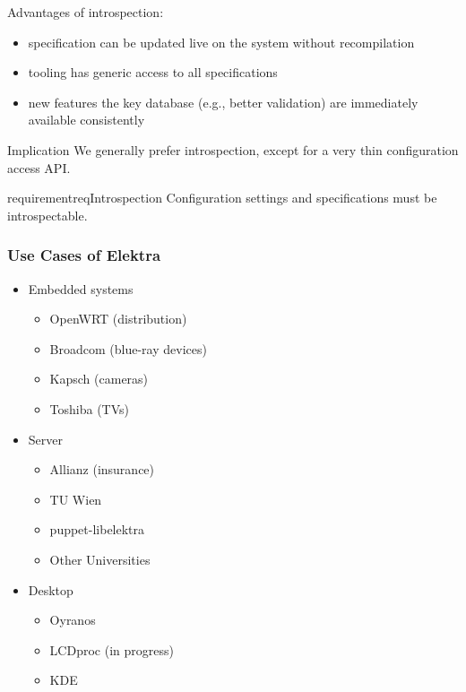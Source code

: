 \begin{frame}
	Advantages of introspection:
	\pause
	\begin{itemize}
	\item specification can be updated live on the system without recompilation
	\item tooling has generic access to all specifications
 	\item new features the key database (e.g., better validation) are immediately available consistently
	\end{itemize}
	\vspace{1em}
	\begin{alertblock}{Implication}
	We generally prefer introspection, except for a very thin configuration access API.
	\end{alertblock}
	\vspace{1em}
	\begin{restatable}{requirement}{reqIntrospection}
	Configuration settings and specifications must be introspectable.%
	\end{restatable}
\end{frame}

\begin{frame}
	\frametitle{Use Cases of Elektra}
	\begin{itemize}[<+->]
	\item Embedded systems
	\begin{itemize}
	\item OpenWRT (distribution)
	\item Broadcom (blue-ray devices)
	\item Kapsch (cameras)
	\item Toshiba (TVs)
	\end{itemize}
	\item Server
	\begin{itemize}
	\item Allianz (insurance)
	\item TU Wien
	\item puppet-libelektra
	\item Other Universities
	\end{itemize}
	\item Desktop
	\begin{itemize}
	\item Oyranos
	\item LCDproc (in progress)
	\item KDE
	\end{itemize}
	\end{itemize}
\end{frame}

